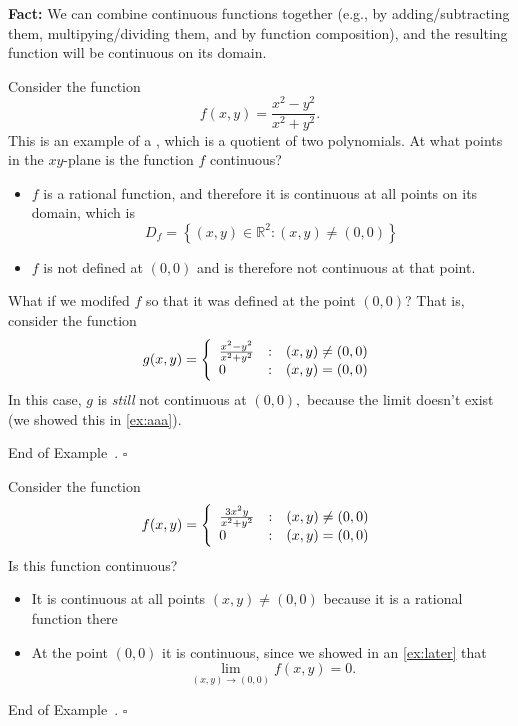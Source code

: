 \documentclass[10pt]{article}
\theoremstyle{definition}
\newtheorem{example}[theorem]{Example}
\renewenvironment{example}
{\begin{oldexample}}
  {\par\smallskip\hfill   End of Example~\theexample. $\square$    \par\end{oldexample}}
\newcommand{\vt}{\vskip 5mm} %
\newcommand{\Fl}{\vt\noindent\textbf} %
\newcommand{\1}[1]{\textbf{1}_{\left[#1\right]}} %
\def\R{\mathbb{R}} %
\newcommand{\dempfcolor}[1]{{\color{RoyalBlue}#1}}
\newcommand{\demph}[1]{\dempfcolor{{\sl #1}}}
\begin{document}
\Fl{Fact:} We can combine continuous functions together (e.g., by
adding/subtracting them, multipying/dividing them, and by function
composition), and the resulting function will be continuous on its domain.


\begin{example}[Rational functions]
  Consider the function
  \begin{equation*}
    f(x,y) = \frac{x^{2}-y^{2}}{x^{2}+y^{2}}.
  \end{equation*}
  This is an example of a \demph{rational function}, which is a quotient of
  two polynomials. At what points in the $xy$-plane is the function $f$ continuous?
  \begin{itemize}
    \item $f$ is a rational function, and therefore it is continuous at all
    points on its domain, which is
    \begin{equation*}
      D_{f} =  \left\{(x,y)\in \R^{2}: (x,y)\neq (0,0)\right\}
    \end{equation*}
    \item $f$ is not defined at $(0,0)$ and is therefore not continuous at
    that point.
  \end{itemize}

  What if we modifed $f$ so that it was defined at the point $(0,0)$? That is,
  consider the function
  \begin{equation*}
    g(x,y) 
    = \left\{ 
      \begin{array}{l@{\quad:\quad}l} \frac{x^{2}-y^{2}}{x^{2}+y^{2}} & (x,y)\neq (0,0)\\
        0 & (x,y)=(0,0) \end{array}\right.
  \end{equation*}
  In this case, $g$ is \textit{still} not continuous at $(0,0),$ because the
  limit doesn't exist (we showed this in \cref{ex:aaa}).
\end{example}

\begin{example}
  Consider the function
  \begin{equation*}
    f(x ,y) = \left\{ \begin{array}{l@{\quad:\quad}l} \frac{3x^{2}y}{x^{2}+y^{2}} & (x,y)\neq (0,0)\\
        0& (x,y) =(0,0)\end{array}\right.
  \end{equation*}
  Is this function continuous?
  \begin{itemize}
    \item It is continuous at all points $(x,y)\neq (0,0)$ because it is a
    rational function there
    \item At the point $(0,0)$ it is continuous, since we showed in an
    \cref{ex:later} that
    \begin{equation*}
      \lim_{(x,y)\to (0,0)}f(x,y) = 0.
    \end{equation*}
  \end{itemize}
\end{example}
\end{document}
